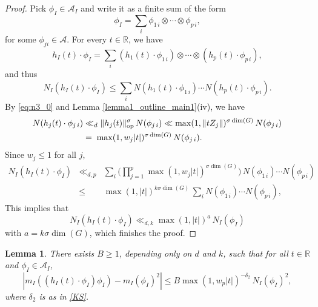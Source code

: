 \documentclass[11pt,reqno,a4paper]{amsart}
\numberwithin{equation}{section}
\newcommand{\cA}{\mathcal{A}}
\theoremstyle{theorem}
\newtheorem{lemma}[theorem]{Lemma}
\theoremstyle{definition}
\begin{document}
\begin{proof}
Pick $\phi_I \in \cA_I$ and write it as a finite sum of the form
\[
\phi_I = \sum_{i} \phi_{1\,i} \otimes \cdots \otimes \phi_{p\,i},
\]
for some $\phi_{ji} \in \cA$. For every $t\in\mathbb{R}$, we have
\[
h_I(t) \cdot \phi_I = \sum_i (h_1(t) \cdot \phi_{1\,i}) \otimes \cdots \otimes(h_p(t) \cdot \phi_{p\,i}),
\]
and thus
\[
N_I(h_I(t) \cdot \phi_I) \leq \sum_i N(h_1(t) \cdot \phi_{1\,i}) \cdots N(h_{p}(t) \cdot \phi_{p\,i}).
\]
By \eqref{eq:n3_0} and Lemma \ref{lemma1_outline_main1}(iv), we have 
\begin{align*}
N(h_j(t) \cdot \phi_{j\,i})&\ll_{d} \|h_j(t)\|_{\rm op}^{\sigma}\, N(\phi_{j\,i})
\ll \max(1,\|tZ_j\|)^{\sigma\dim(G)}\, N(\phi_{j\,i})\\
&=\; \max(1,w_j |t|)^{\sigma\dim(G)}\, N(\phi_{j\,i}).
\end{align*}
Since $w_j \leq 1$ for all $j$,
\begin{eqnarray*}
N_I(h_I(t)  \cdot \phi_I) 
&\ll_{d,p} & 
\sum_i \Big( \prod_{j=1}^p \max(1,w_j |t|)^{\sigma\dim(G)} \Big) \, N(\phi_{1\,i}) \cdots N(\phi_{p\,i}) \\
&\leq & 
 \max(1,|t|)^{k \sigma\dim(G)} \, \sum_i N(\phi_{1\,i}) \cdots N(\phi_{p\,i}),
\end{eqnarray*}
This implies that
$$
N_I(h_I(t)  \cdot \phi_I) 
\ll_{d,k}  \max(1,|t|)^{a} \, N_I(\phi_{I})
$$
with $a=k \sigma\dim(G)$, which finishes the proof.
\end{proof}

\begin{lemma}
\label{lemma2}
There exists $B \geq 1$, depending only on $d$ and $k$, such that for all $t\in \mathbb{R}$ and $\phi_I \in \cA_I$,
$$
|m_I((h_I(t) \cdot \phi_I) \phi_I) - m_I(\phi_I)^2| \leq B \max(1,w_p |t|)^{-\delta_2} \, N_I(\phi_I)^2,
$$
where $\delta_2$ is as in \eqref{KS}.
\end{lemma}
\end{document}
